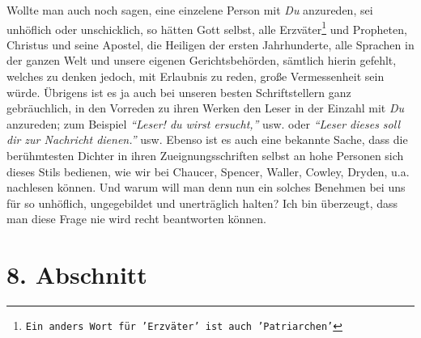 Wollte man auch noch sagen, eine einzelene Person mit \textit{Du} anzureden, sei
unhöflich oder unschicklich, so hätten Gott selbst, alle
Erzväter\footnote{\texttt{Ein anders Wort für 'Erzväter' ist auch
'Patriarchen'}}
und Propheten,
Christus und seine Apostel, die Heiligen der ersten Jahrhunderte, alle Sprachen
in der ganzen Welt und unsere eigenen Gerichtsbehörden, sämtlich hierin
gefehlt, welches zu denken jedoch, mit Erlaubnis zu reden, große Vermessenheit
sein würde. Übrigens ist es ja auch bei unseren besten Schriftstellern ganz
gebräuchlich, in den Vorreden zu ihren Werken den Leser in der Einzahl mit
\textit{Du} anzureden; zum Beispiel \textit{"`Leser! du wirst ersucht,"'} usw. oder
\textit{"`Leser dieses
soll dir zur Nachricht dienen."'} usw. Ebenso ist es auch eine bekannte
Sache,
dass die berühmtesten Dichter in ihren Zueignungsschriften selbst an hohe
Personen sich dieses Stils bedienen, wie wir bei
Chaucer, Spencer,
Waller,
Cowley, Dryden, u.a. nachlesen
können. Und warum will man denn nun ein solches
Benehmen bei uns für so unhöflich, ungegebildet und unerträglich halten? Ich bin
überzeugt, dass man diese Frage nie wird recht beantworten können.

\section{8. Abschnitt} \label{kap10_ab8}

